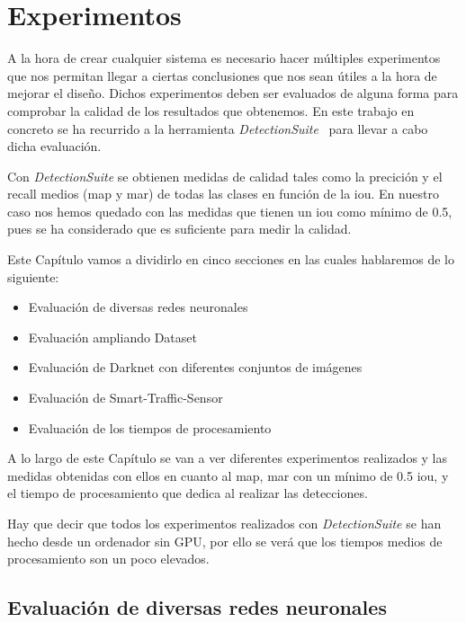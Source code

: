 \chapter{Experimentos}\label{cap.experimentos}

A la hora de crear cualquier sistema es necesario hacer múltiples experimentos que nos permitan llegar a ciertas conclusiones que nos sean útiles a la hora de mejorar el diseño. Dichos experimentos deben ser evaluados de alguna forma para comprobar la calidad de los resultados que obtenemos. En este trabajo en concreto se ha recurrido a la herramienta \textit{DetectionSuite}~\cite{detectionsuite} para llevar a cabo dicha evaluación.

Con \textit{DetectionSuite} se obtienen medidas de calidad tales como la precición y el recall medios (\acrshort{map} y \acrshort{mar}) de todas las clases en función de la \acrfull{iou}. En nuestro caso nos hemos quedado con las medidas que tienen un \acrshort{iou} como mínimo de 0.5, pues se ha considerado que es suficiente para medir la calidad.

Este Capítulo vamos a dividirlo en cinco secciones en las cuales hablaremos de lo siguiente:
\begin{itemize}
    \item Evaluación de diversas redes neuronales
    \item Evaluación ampliando Dataset
    \item Evaluación de Darknet con diferentes conjuntos  de imágenes
    \item Evaluación de Smart-Traffic-Sensor
    \item Evaluación de los tiempos de procesamiento
\end{itemize}

A lo largo de este Capítulo se van a ver diferentes experimentos realizados y las medidas obtenidas con ellos en cuanto al \acrfull{map}, \acrfull{mar} con un mínimo de 0.5 \acrshort{iou}, y el tiempo de procesamiento que dedica al realizar las detecciones.

Hay que decir que todos los experimentos realizados con \textit{DetectionSuite} se han hecho desde un ordenador sin GPU, por ello se verá que los tiempos medios de procesamiento son un poco elevados.

\section{Evaluación de diversas redes neuronales}
 
